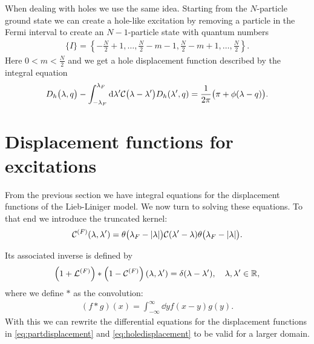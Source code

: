 \documentclass[11pt, a4paper]{report} %
\begin{document}
When dealing with holes we use the same idea.
Starting from the \(N\)-particle ground state we can create a hole-like excitation by removing a particle in the Fermi interval to create an \(N-1\)-particle state with quantum numbers
\begin{align}
  \label{eq:26}
  \{I\} = \left\{-\frac{N}{2}+1,\ldots,\frac{N}{2}-m-1,\frac{N}{2}-m+1,\ldots,\frac{N}{2}\right\}.
\end{align}
Here \(0<m<\frac{N}{2}\) and we get a hole displacement function described by the integral equation~\cite{Caux2015}
\begin{align}
  \label{eq:holedisplacement}
  D_h\qty\big(\lambda,q) - \int_{-\lambda_F}^{\lambda_F} \dd \lambda' \mathcal{C}\qty\big(\lambda-\lambda') D_h\qty(\lambda',q) = \frac{1}{2\pi}\qty\big(\pi+\phi(\lambda-q)).
\end{align}






\section{Displacement functions for excitations}

From the previous section we have integral equations for the displacement functions of the Lieb-Liniger model.
We now turn to solving these equations.
To that end we introduce the truncated kernel:
\begin{align}
  \label{eq:inversetruncated}
  \mathcal{C}^{(F)}\qty(\lambda,\lambda') = \theta\qty\big(\lambda_F-\abs{\lambda}) \mathcal{C}\qty(\lambda'-\lambda) \theta\qty\big(\lambda_F-\abs{\lambda}).
\end{align}

Its associated inverse is defined by
\begin{align}
  \label{eq:32}
  	\left(1 + \mathcal{L}^{(F)}\right) * \left(1 - \mathcal{C}^{(F)}\right)\qty(\lambda,\lambda')=\delta\qty(\lambda-\lambda'), \quad \lambda, \lambda' \in \mathbb{R},
\end{align}
where we define \(*\) as the convolution:
\begin{align}
  \label{eq:29}
  (f*g)(x) = \int_{-\infty}^{\infty} \dd y f(x-y)g(y).
\end{align}
With this we can rewrite the differential equations for the displacement functions in \cref{eq:partdisplacement} and \cref{eq:holedisplacement} to be valid for a larger domain.
\end{document}
